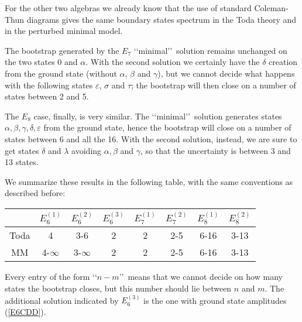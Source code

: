 \documentclass[a4paper,12pt]{report}
\begin{document}
\vspace{0.5cm}

For the other two algebras we already know that the use of standard Coleman-Thun diagrams gives the same boundary
states spectrum in the Toda theory and in the perturbed minimal model.

The bootstrap generated by the $E_{7}$ \lq\lq minimal\rq\rq \, solution remains unchanged on the two states $0$
and $\alpha$. With the second solution we certainly have the $\delta$ creation from the ground state (without
$\alpha$, $\beta$ and $\gamma$), but we cannot decide what happens with the following states $\varepsilon$,
$\sigma$ and $\tau$; the bootstrap will then close on a number of states between 2 and 5.

The $E_{8}$ case, finally, is very similar. The \lq\lq minimal\rq\rq \, solution generates states
$\alpha,\beta,\gamma,\delta,\varepsilon$ from the ground state, hence the bootstrap will close on a number of
states between 6 and all the 16. With the second solution, instead, we are sure to get states $\delta$ and
$\lambda$ avoiding $\alpha,\beta$ and $\gamma$, so that the uncertainty is between 3 and 13 states.

\vspace{0.5cm}

We summarize these results in the following table, with the same conventions as described before:

\begin{center}
\begin{tabular}{|c|c c c|c c|c c|}\hline
&  $ E_{6}^{(1)}$  & $ E_{6}^{(2)}$ & $ E_{6}^{(3)}$ & $ E_{7}^{(1)}$ & $ E_{7}^{(2)}$ & $ E_{8}^{(1)}$ & $
E_{8}^{(2)}$ \\ \hline
Toda  & 4 & 3-6 & 2 & 2 & 2-5 & 6-16 & 3-13 \\
MM & 4-$\infty$ & 3-$\infty$ & 2 & 2 & 2-5 & 6-16 & 3-13 \\ \hline
  \end{tabular}
\end{center}

\vspace{0.5cm}

Every entry of the form \lq\lq $n-m$\rq\rq \, means that we cannot decide on how many states the bootstrap
closes, but this number should lie between $n$ and $m$. The additional solution indicated by $E_{6}^{(3)}$ is the
one with ground state amplitudes (\ref{E6CDD}).

\vspace{1cm}
\end{document}
